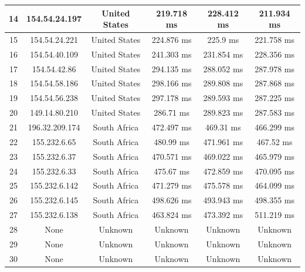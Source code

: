 \begin{table}[]
\begin{tabular}{ | c | c | c | c | c | c | }
  14	&154.54.24.197      & 	   United States  &  	     219.718 ms     &	     228.412 ms     &     211.934 ms     \\ \hline  
  15	&154.54.24.221      & 	   United States  &  	     224.876 ms     &	       225.9 ms     &     221.758 ms     \\ \hline  
  16	&154.54.40.109      & 	   United States  &  	     241.303 ms     &	     231.854 ms     &     228.356 ms     \\ \hline  
  17	&154.54.42.86       & 	   United States  &  	     294.135 ms     &	     288.052 ms     &     287.978 ms     \\ \hline  
  18	&154.54.58.186      & 	   United States  &  	     298.166 ms     &	     289.808 ms     &     287.868 ms     \\ \hline  
  19	&154.54.56.238      & 	   United States  &  	     297.178 ms     &	     289.593 ms     &     287.225 ms     \\ \hline  
  20	&149.14.80.210      & 	   United States  &  	      286.71 ms     &	     289.823 ms     &     287.583 ms     \\ \hline  
  21	&196.32.209.174     & 	    South Africa  &  	     472.497 ms     &	      469.31 ms     &     466.299 ms     \\ \hline  
  22	&155.232.6.65       & 	    South Africa  &  	      480.99 ms     &	     471.961 ms     &      467.52 ms     \\ \hline  
  23	&155.232.6.37       & 	    South Africa  &  	     470.571 ms     &	     469.022 ms     &     465.979 ms     \\ \hline  
  24	&155.232.6.33       & 	    South Africa  &  	      475.67 ms     &	     472.859 ms     &     470.095 ms     \\ \hline  
  25	&155.232.6.142      & 	    South Africa  &  	     471.279 ms     &	     475.578 ms     &     464.099 ms     \\ \hline  
  26	&155.232.6.145      & 	    South Africa  &  	     498.626 ms     &	     493.943 ms     &     498.355 ms     \\ \hline  
  27	&155.232.6.138      & 	    South Africa  &  	     463.824 ms     &	     473.392 ms     &     511.219 ms     \\ \hline  
  28	&None               & 	      Unknown     &  	      Unknown       &	      Unknown       &      Unknown       \\ \hline  
  29	&None               & 	      Unknown     &  	      Unknown       &	      Unknown       &      Unknown       \\ \hline  
  30	&None               & 	      Unknown     &  	      Unknown       &	      Unknown       &      Unknown       \\ \hline  
\end{tabular}
\end{table}



